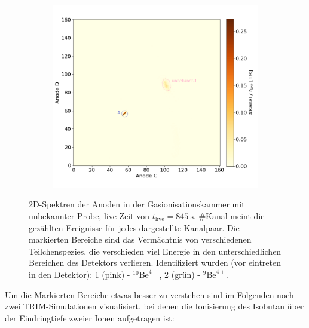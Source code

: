 \begin{figure}[H]
\begin{subfigure}{0.47\textwidth}
    \end{subfigure}
    \begin{subfigure}{0.47\textwidth}
        \centering
        \includegraphics[width=\linewidth]{Pictures/Gasdetektor/19_probe_CD.png}
    \end{subfigure}
    \caption{2D-Spektren der Anoden in der Gasionisationskammer mit unbekannter Probe, live-Zeit von $t_{\text{live}} = \SI{845}{\second}$. \#Kanal meint die gezählten Ereignisse für jedes dargestellte Kanalpaar. Die markierten Bereiche sind das Vermächtnis von verschiedenen Teilchenspezies, die verschieden viel Energie in den unterschiedlichen Bereichen des Detektors verlieren.  Identifiziert wurden (vor eintreten in den Detektor): 1 (pink) - $^{10}\text{Be}^{4+}$, 2 (grün) - $^{9}\text{Be}^{4+}$.}
    \label{Auswertung_Gasdetektor_2DSpektren_unbekannt}
\end{figure}
Um die Markierten Bereiche etwas besser zu verstehen sind im Folgenden noch zwei TRIM-Simulationen visualisiert, bei denen die Ionisierung des Isobutan über der Eindringtiefe zweier Ionen aufgetragen ist:
